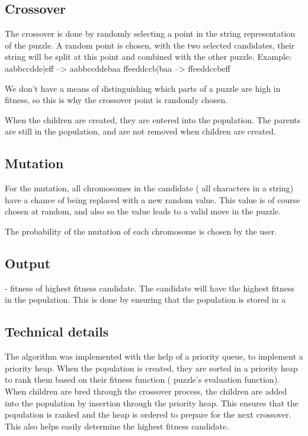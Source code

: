 \documentclass{report}
\begin{document}
\subsection{Crossover}
The crossover is done by randomly selecting a point in the string representation of the puzzle. A random point is chosen, with the two selected candidates, their string will be split at this point and combined with the other puzzle. 
Example: 
aabbccdde|eff --> aabbccddebaa
ffeeddccb|baa --> ffeeddccbeff

We don't have a means of distinguishing which parts of a puzzle are high in fitness, so this is why the crossover point is randomly chosen.

When the children are created, they are entered into the population. The parents are still in the population, and are not removed when children are created.


\subsection{Mutation}
For the mutation, all chromosomes in the candidate ( all characters in a string) have a chance of being replaced with a new random value. This value is of course chosen at random, and also so the value leads to a valid move in the puzzle.

The probability of the mutation of each chromosome is chosen by the user.	


\subsection{Output}
	- fitness of highest fitness candidate.
The candidate will have the highest fitness in the population. This is done by ensuring that the population is stored in a 


\subsection{Technical details}
The algorithm was implemented with the help of a priority queue, to implement a priority heap. When the population is created, they are sorted in a priority heap to rank them based on their fitness function ( puzzle's evaluation function). When children are bred through the crossover process, the children are added into the population by insertion through the priority heap. This ensures that the population is ranked and the heap is ordered to prepare for the next crossover. This also helps easily determine the highest fitness candidate.
\end{document}
